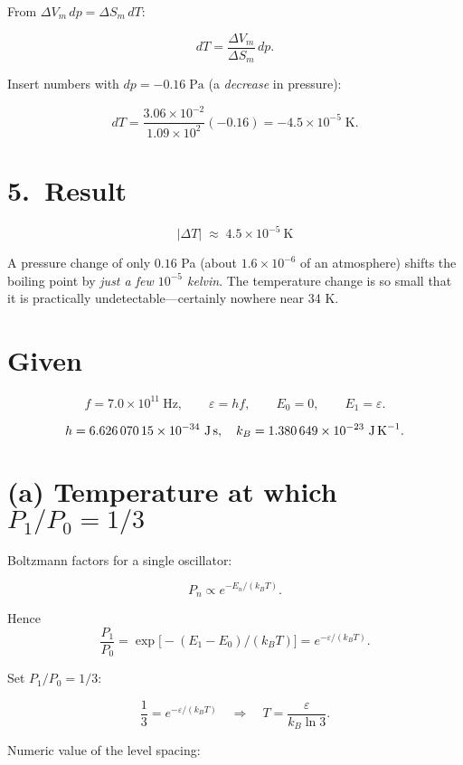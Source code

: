 \documentclass[12pt]{article}
\theoremstyle{definition} %
\theoremstyle{plain} %
\begin{document}
From $\Delta V_m\,dp = \Delta S_m\,dT$:

\[
dT = \frac{\Delta V_m}{\Delta S_m}\,dp.
\]

Insert numbers with  
$dp=-0.16\;\text{Pa}$ (a \emph{decrease} in pressure):

\[
dT
  = \frac{3.06\times10^{-2}}{1.09\times10^{2}}(-0.16)
  = -4.5\times10^{-5}\;\text{K}.
\]

\section*{5.\  Result}

\[
\boxed{\;|\Delta T|\;\approx\;4.5\times10^{-5}\ \text{K}\;}
\]

A pressure change of only $0.16$ Pa (about $1.6\times10^{-6}$ of an
atmosphere) shifts the boiling point by \emph{just a few
$10^{-5}$ kelvin}.  The temperature change is so small that it is
practically undetectable—certainly nowhere near 34 K.

\section*{Given}
\[
f = 7.0\times10^{11}\ \text{Hz},
\qquad
\varepsilon = h f,
\qquad
E_0 = 0,
\qquad
E_1 = \varepsilon .
\]

\[
h = 6.626\,070\,15\times10^{-34}\ \text{J\,s},
\quad
k_B = 1.380\,649\times10^{-23}\ \text{J\,K}^{-1}.
\]

\section*{(a) Temperature at which $P_1/P_0 = 1/3$}

Boltzmann factors for a single oscillator:

\[
P_n \propto e^{-E_n/(k_B T)} .
\]

Hence
\[
\frac{P_1}{P_0}
   = \exp\!\bigl[-(E_1-E_0)/(k_B T)\bigr]
   = e^{-\varepsilon/(k_B T)} .
\]

Set $P_1/P_0 = 1/3$:

\[
\frac{1}{3} = e^{-\varepsilon/(k_B T)}
\quad\Longrightarrow\quad
T = \frac{\varepsilon}{k_B \ln 3}.
\]

Numeric value of the level spacing:
\end{document}
